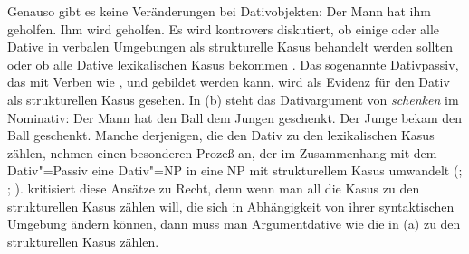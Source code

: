 Genauso gibt es keine Veränderungen bei Dativobjekten:
\eal
\ex Der Mann hat ihm geholfen.
\ex Ihm wird geholfen.
\zl
Es wird kontrovers diskutiert, ob einige oder alle Dative in verbalen Umgebungen als
strukturelle Kasus behandelt werden sollten \citep{denBesten85,denBesten85b,Fanselow87a,Fanselow2000b,%
Fanselow2003b,%
Czepluch88,Wegener90,Sternefeld95a,%
Stechow96a,Wunderlich97a,Wunderlich97c,Ryu97a,Molnarfi98a,Gunkel2003b}
oder ob alle Dative lexikalischen Kasus bekommen \citep{Haider85b,Haider86,Haider93a,%
HR2003a,%
HM94a,%
Scherpenisse86a,%
Pollard94a,Mueller99a,Mueller2001a,Meurers99b,VS98a,Abraham95a-u,%
McIntyre2006a}. %
%
%
Das sogenannte Dativpassiv, das mit Verben wie
,  und  gebildet werden kann,
wird als Evidenz für den Dativ als strukturellen Kasus gesehen.
In (b) steht das Dativargument von \emph{schenken} im Nominativ:
\eal
\ex Der Mann  hat   den Ball dem Jungen geschenkt.
\ex Der Junge bekam den Ball            geschenkt.
\zl
Manche derjenigen, die den Dativ zu den lexikalischen Kasus zählen, nehmen
einen besonderen Prozeß an, der im Zusammenhang mit dem Dativ"=Passiv
eine Dativ"=NP in eine NP mit strukturellem Kasus umwandelt 
(\citealp[Abschnitt~4.1]{Haider86}; \citealp[]{HM94a}; \citealp[]{Mueller99a}).
\citet{Gunkel2003b} kritisiert diese Ansätze zu Recht, denn wenn man all die
Kasus zu den strukturellen Kasus zählen will, die sich in Abhängigkeit von
ihrer syntaktischen Umgebung ändern können, dann muss man Argumentdative wie die
in (a) zu den strukturellen Kasus zählen.

